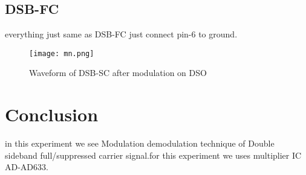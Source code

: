 \documentclass{article}
\begin{document}
\subsection{DSB-FC}
everything just same as DSB-FC just connect pin-6 to ground.
\begin{figure*}[ht]
	\centering
	\texttt{[image: mn.png]}
	\caption{Waveform of DSB-SC after modulation on DSO}
	\label{dsbsc}
\end{figure*}
 

\section{Conclusion}
 in this experiment we see Modulation demodulation technique of Double sideband full/suppressed carrier signal.for this experiment we uses multiplier IC AD-AD633.
\end{document}
